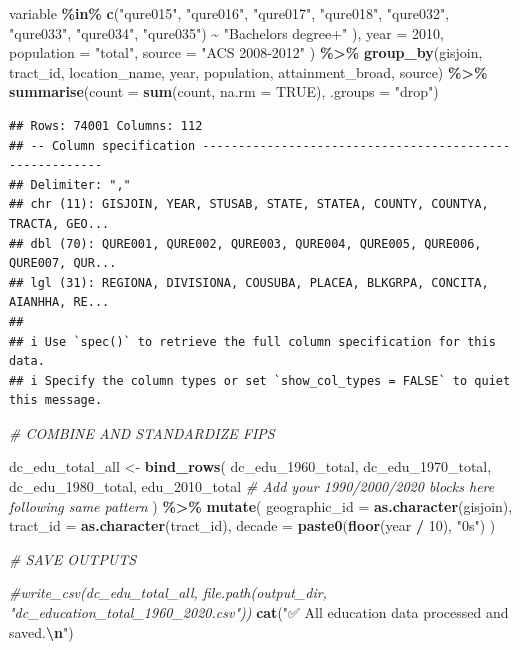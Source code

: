 \documentclass[
]{article}
\newenvironment{Shaded}{\begin{snugshade}}{\end{snugshade}}
\newcommand{\AttributeTok}[1]{\textcolor[rgb]{0.13,0.29,0.53}{#1}}
\newcommand{\CommentTok}[1]{\textcolor[rgb]{0.56,0.35,0.01}{\textit{#1}}}
\newcommand{\ConstantTok}[1]{\textcolor[rgb]{0.56,0.35,0.01}{#1}}
\newcommand{\DecValTok}[1]{\textcolor[rgb]{0.00,0.00,0.81}{#1}}
\newcommand{\FunctionTok}[1]{\textcolor[rgb]{0.13,0.29,0.53}{\textbf{#1}}}
\newcommand{\NormalTok}[1]{#1}
\newcommand{\OtherTok}[1]{\textcolor[rgb]{0.56,0.35,0.01}{#1}}
\newcommand{\SpecialCharTok}[1]{\textcolor[rgb]{0.81,0.36,0.00}{\textbf{#1}}}
\newcommand{\StringTok}[1]{\textcolor[rgb]{0.31,0.60,0.02}{#1}}
\begin{document}
\begin{Shaded}
\begin{Highlighting}[]
\NormalTok{      variable }\SpecialCharTok{\%in\%} \FunctionTok{c}\NormalTok{(}\StringTok{"qure015"}\NormalTok{, }\StringTok{"qure016"}\NormalTok{, }\StringTok{"qure017"}\NormalTok{, }\StringTok{"qure018"}\NormalTok{, }\StringTok{"qure032"}\NormalTok{, }\StringTok{"qure033"}\NormalTok{, }\StringTok{"qure034"}\NormalTok{, }\StringTok{"qure035"}\NormalTok{) }\SpecialCharTok{\textasciitilde{}} \StringTok{"Bachelor\textquotesingle{}s degree+"}
\NormalTok{    ),}
    \AttributeTok{year =} \DecValTok{2010}\NormalTok{, }\AttributeTok{population =} \StringTok{"total"}\NormalTok{, }\AttributeTok{source =} \StringTok{"ACS 2008{-}2012"}
\NormalTok{  ) }\SpecialCharTok{\%\textgreater{}\%}
  \FunctionTok{group\_by}\NormalTok{(gisjoin, tract\_id, location\_name, year, population, attainment\_broad, source) }\SpecialCharTok{\%\textgreater{}\%}
  \FunctionTok{summarise}\NormalTok{(}\AttributeTok{count =} \FunctionTok{sum}\NormalTok{(count, }\AttributeTok{na.rm =} \ConstantTok{TRUE}\NormalTok{), }\AttributeTok{.groups =} \StringTok{"drop"}\NormalTok{)}
\end{Highlighting}
\end{Shaded}

\begin{verbatim}
## Rows: 74001 Columns: 112
## -- Column specification --------------------------------------------------------
## Delimiter: ","
## chr (11): GISJOIN, YEAR, STUSAB, STATE, STATEA, COUNTY, COUNTYA, TRACTA, GEO...
## dbl (70): QURE001, QURE002, QURE003, QURE004, QURE005, QURE006, QURE007, QUR...
## lgl (31): REGIONA, DIVISIONA, COUSUBA, PLACEA, BLKGRPA, CONCITA, AIANHHA, RE...
## 
## i Use `spec()` to retrieve the full column specification for this data.
## i Specify the column types or set `show_col_types = FALSE` to quiet this message.
\end{verbatim}

\begin{Shaded}
\begin{Highlighting}[]
\CommentTok{\# COMBINE AND STANDARDIZE FIPS}

\NormalTok{dc\_edu\_total\_all }\OtherTok{\textless{}{-}} \FunctionTok{bind\_rows}\NormalTok{(}
\NormalTok{  dc\_edu\_1960\_total, dc\_edu\_1970\_total, dc\_edu\_1980\_total, }
\NormalTok{  edu\_2010\_total }\CommentTok{\# Add your 1990/2000/2020 blocks here following same pattern}
\NormalTok{) }\SpecialCharTok{\%\textgreater{}\%}
  \FunctionTok{mutate}\NormalTok{(}
    \AttributeTok{geographic\_id =} \FunctionTok{as.character}\NormalTok{(gisjoin),}
    \AttributeTok{tract\_id =} \FunctionTok{as.character}\NormalTok{(tract\_id),}
    \AttributeTok{decade =} \FunctionTok{paste0}\NormalTok{(}\FunctionTok{floor}\NormalTok{(year }\SpecialCharTok{/} \DecValTok{10}\NormalTok{), }\StringTok{"0s"}\NormalTok{)}
\NormalTok{  )}


\CommentTok{\#  SAVE OUTPUTS}

\CommentTok{\#write\_csv(dc\_edu\_total\_all, file.path(output\_dir, "dc\_education\_total\_1960\_2020.csv"))}
\FunctionTok{cat}\NormalTok{(}\StringTok{"✅ All education data processed and saved.}\SpecialCharTok{\textbackslash{}n}\StringTok{"}\NormalTok{)}
\end{Highlighting}
\end{Shaded}
\end{document}
